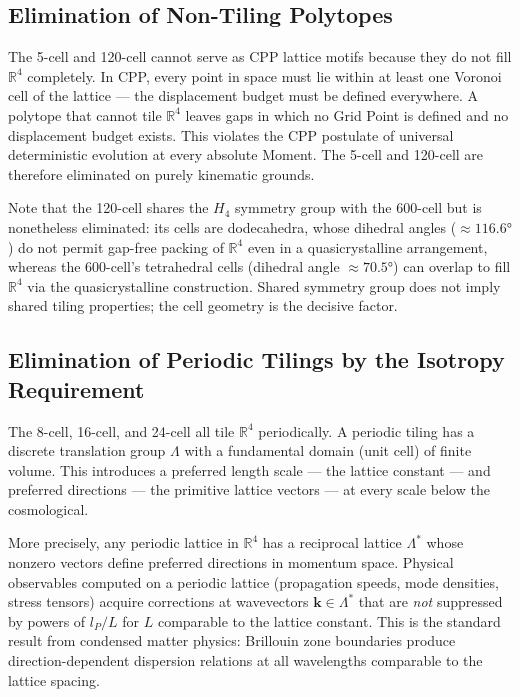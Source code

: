 \documentclass[11pt,letterpaper]{article}
\begin{document}
\subsection{Elimination of Non-Tiling Polytopes}

The 5-cell and 120-cell cannot serve as CPP lattice motifs because they do not fill $\mathbb{R}^4$ completely. In CPP, every point in space must lie within at least one Voronoi cell of the lattice — the displacement budget must be defined everywhere. A polytope that cannot tile $\mathbb{R}^4$ leaves gaps in which no Grid Point is defined and no displacement budget exists. This violates the CPP postulate of universal 
deterministic evolution at every absolute Moment. The 5-cell and 120-cell are therefore eliminated on purely kinematic grounds.

Note that the 120-cell shares the $H_4$ symmetry group with the 600-cell 
but is nonetheless eliminated: its cells are dodecahedra, whose dihedral 
angles ($\approx 116.6°$) do not permit gap-free packing of $\mathbb{R}^4$ 
even in a quasicrystalline arrangement, whereas the 600-cell's tetrahedral 
cells (dihedral angle $\approx 70.5°$) can overlap to fill $\mathbb{R}^4$ 
via the quasicrystalline construction. Shared symmetry group does not imply 
shared tiling properties; the cell geometry is the decisive factor.

\subsection{Elimination of Periodic Tilings by the Isotropy Requirement}

The 8-cell, 16-cell, and 24-cell all tile $\mathbb{R}^4$ periodically. A periodic tiling has a discrete translation group $\Lambda$ with a fundamental domain (unit cell) of finite volume. This introduces a preferred length scale — the lattice constant — and preferred directions — the primitive lattice vectors — at every scale below the cosmological.

More precisely, any periodic lattice in $\mathbb{R}^4$ has a reciprocal lattice $\Lambda^*$ whose nonzero vectors define preferred directions in momentum space. Physical observables computed on a periodic lattice (propagation speeds, mode densities, stress tensors) acquire corrections at wavevectors $\mathbf{k} \in \Lambda^*$ that are \emph{not} suppressed 
by powers of $l_P/L$ for $L$ comparable to the lattice constant. This is the standard result from condensed matter physics: Brillouin zone boundaries produce direction-dependent dispersion relations at all wavelengths comparable to the lattice spacing.
\end{document}
